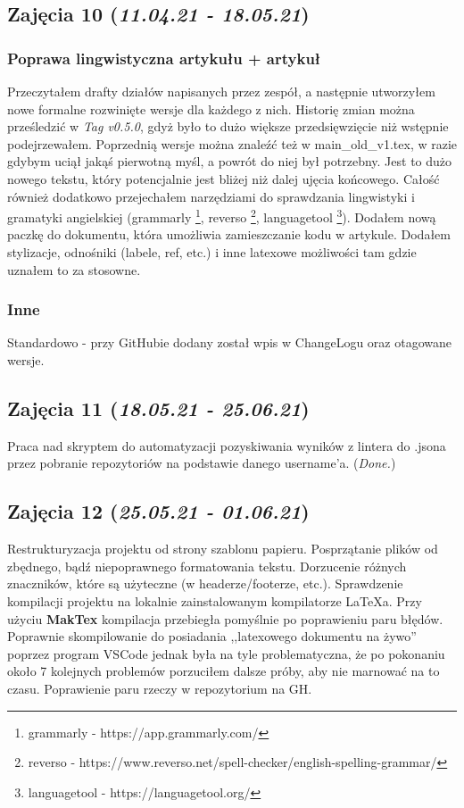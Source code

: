 \documentclass[graybox]{svmult}
\begin{document}
\subsection{Zajęcia 10 (\emph{11.04.21 - 18.05.21})}

\subsubsection{Poprawa lingwistyczna artykułu + artykuł}

Przeczytałem drafty działów napisanych przez zespół, a następnie utworzyłem nowe formalne rozwinięte wersje dla każdego z nich. Historię zmian można prześledzić w  \emph{Tag v0.5.0}, gdyż było to dużo większe przedsięwzięcie niż wstępnie podejrzewałem. Poprzednią wersje można znaleźć też w main\_old\_v1.tex, w razie gdybym uciął jakąś pierwotną myśl, a powrót do niej był potrzebny. Jest to dużo nowego tekstu, który potencjalnie jest bliżej niż dalej ujęcia końcowego. Całość również dodatkowo przejechałem narzędziami do sprawdzania lingwistyki i gramatyki angielskiej (grammarly \footnote{grammarly - https://app.grammarly.com/}, reverso \footnote{reverso - https://www.reverso.net/spell-checker/english-spelling-grammar/}, languagetool \footnote{languagetool - https://languagetool.org/}). Dodałem nową paczkę do dokumentu, która umożliwia zamieszczanie kodu w artykule. Dodałem stylizacje, odnośniki (labele, ref, etc.) i inne latexowe możliwości tam gdzie uznałem to za stosowne.

\subsubsection{Inne}

Standardowo - przy GitHubie dodany został wpis w ChangeLogu oraz otagowane wersje.

\subsection{Zajęcia 11 (\emph{18.05.21 - 25.06.21})}

Praca nad skryptem do automatyzacji pozyskiwania wyników z lintera do .jsona przez pobranie repozytoriów na podstawie danego username'a. (\textit{Done.})

\subsection{Zajęcia 12 (\emph{25.05.21 - 01.06.21})}

Restrukturyzacja projektu od strony szablonu papieru. Posprzątanie plików od zbędnego, bądź niepoprawnego formatowania tekstu. Dorzucenie różnych znaczników, które są użyteczne (w headerze/footerze, etc.). Sprawdzenie kompilacji projektu na lokalnie zainstalowanym kompilatorze LaTeXa. Przy użyciu \textbf{MakTex} kompilacja przebiegła pomyślnie po poprawieniu paru błędów. Poprawnie skompilowanie do posiadania ,,latexowego dokumentu na żywo'' poprzez program VSCode jednak była na tyle problematyczna, że po pokonaniu około 7 kolejnych problemów porzuciłem dalsze próby, aby nie marnować na to czasu. Poprawienie paru rzeczy w repozytorium na GH.
\end{document}
